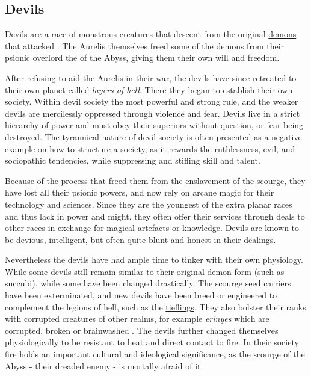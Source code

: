 \subsection{Devils}
\label{sec:Devils}

Devils are a race of monstrous creatures that descent from the original
\hyperref[sec:Demons]{demons} that attacked . The Aurelis
themselves freed some of the demons from their psionic overlord the
 of the Abyss, giving them their own will and freedom.

After refusing to aid the Aurelis in their war, the devils have since
retreated to their own planet called \emph{layers of hell}. There they began to
establish their own society. Within devil society the most powerful and strong
rule, and the weaker devils are mercilessly oppressed through violence and
fear. Devils live in a strict hierarchy of power and must obey their
superiors without question, or fear being destroyed. The tyrannical nature of
devil society is often presented as a negative example on how to structure a
society, as it rewards the ruthlessness, evil, and sociopathic tendencies,
while suppressing and stifling skill and talent.

Because of the process that freed them from the enslavement of the scourge,
they have lost all their psionic powers, and now rely on arcane magic for
their technology and sciences. Since they are the youngest of the extra planar
races and thus lack in power and might, they often offer their services
through deals to other races in exchange for magical artefacts or
knowledge. Devils are known to be devious, intelligent, but often quite blunt
and honest in their dealings.

Nevertheless the devils have had ample time to tinker with their own
physiology. While some devils still remain similar to their original demon
form (such as succubi), while some have been changed drastically. The scourge
seed carriers have been exterminated, and new devils have been breed or
engineered to complement the legions of hell, such as the
\hyperref[sec:Tieflings]{tieflings}. They also bolster their ranks with
corrupted creatures of other realms, for example \emph{erinyes} which are
corrupted, broken or brainwashed . The devils further
changed themselves physiologically to be resistant to heat and direct contact
to fire. In their society fire holds an important cultural and ideological
significance, as the scourge of the Abyss - their dreaded enemy - is mortally
afraid of it.

